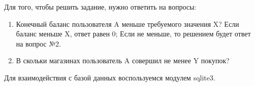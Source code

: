 \solutionSection

Для того, чтобы решить задание, нужно ответить на вопросы:

\begin{enumerate}
    \item Конечный баланс пользователя A меньше требуемого значения X? Если баланс меньше X, ответ равен 0; Если не меньше, то решением будет ответ на вопрос №2.
    \item В скольки магазинах пользователь A совершил не менее Y покупок?
\end{enumerate}

Для взаимодействия с базой данных воспользуемся модулем sqlite3.

\codeExample


